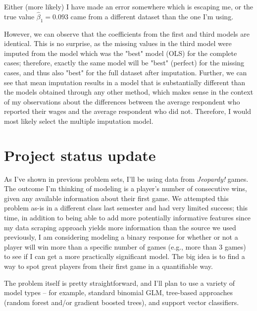 \documentclass{article}
\begin{document}
Either (more likely) I have made an error somewhere which is escaping me, or the true value $\hat{\beta}_1=0.093$ came from a different dataset than the one I'm using.

\smallskip 

However, we can observe that the coefficients from the first and third models are identical. This is no surprise, as the missing values in the third model were imputed from the model which was the "best" model (OLS) for the complete cases; therefore, exactly the same model will be "best" (perfect) for the missing cases, and thus also "best" for the full dataset after imputation. Further, we can see that mean imputation results in a model that is substantially different than the models obtained through any other method, which makes sense in the context of my observations about the differences between the average respondent who reported their wages and the average respondent who did not. Therefore, I would most likely select the multiple imputation model.

\section{Project status update}

As I've shown in previous problem sets, I'll be using data from \textit{Jeopardy!} games. The outcome I'm thinking of modeling is a player's number of consecutive wins, given any available information about their first game. We attempted this problem as-is in a different class last semester and had very limited success; this time, in addition to being able to add more potentially informative features since my data scraping approach yields more information than the source we used previously, I am considering modeling a binary response for whether or not a player will win more than a specific number of games (e.g., more than 3 games) to see if I can get a more practically significant model. The big idea is to find a way to spot great players from their first game in a quantifiable way.

\smallskip

The problem itself is pretty straightforward, and I'll plan to use a variety of model types -- for example, standard binomial GLM, tree-based approaches (random forest and/or gradient boosted trees), and support vector classifiers.
\end{document}
